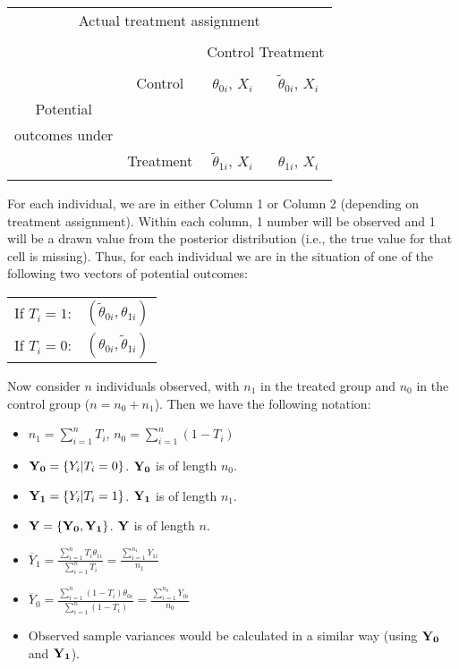 \documentclass[oneside,letterpaper,titlepage,12pt]{article}
\begin{document}
\begin{center}
\begin{tabular}{cc|c|c|}
\multicolumn{4}{c}{\hspace*{4cm} Actual treatment assignment} \\
\\
\multicolumn{2}{c}{} & \multicolumn{2}{c}{Control \hfill Treatment} \\
\cline{3-4}
& & & \phantom{abcd} \\
& Control & $\theta_{0i}$, $X_i$ & $\tilde{\theta}_{0i}$, $X_i$ \\
Potential & & &  \phantom{abcd} \\
\cline{3-4}
outcomes under & & & \phantom{abcd} \\
& Treatment  & $\tilde{\theta}_{1i}$, $X_i$ & $\theta_{1i}$, $X_i$ \\
& & & \phantom{abcd} \\
\cline{3-4}
\end{tabular}
\end{center}
 
For each individual, we are in either Column 1 or Column 2 (depending on treatment assignment).  Within each column, 1 number will be observed and 1 will be a drawn
value from the posterior distribution (i.e., the true value for that cell is missing). Thus, for each individual we are in the situation of one of the 
following two vectors of potential outcomes:

\begin{center}
\begin{tabular}{rl}
If $T_i=1$: & $(\tilde\theta_{0i}, \theta_{1i})$ \\
If $T_i=0$: & $(\theta_{0i}, \tilde\theta_{1i})$ \\
\end{tabular}
\end{center}

Now consider $n$ individuals observed, with $n_1$ in the treated group and $n_0$ in the control group ($n=n_0+n_1$).  Then we have the following notation:
\begin{itemize}
\item $n_1=\sum_{i=1}^n T_i$, $n_0=\sum_{i=1}^n (1-T_i)$
\item ${\bf Y_0} = \{Y_{i}|T_i=0\}$.  ${\bf Y_0}$ is of length $n_0$.
\item ${\bf Y_1} = \{Y_{i}|T_i=1\}$.  ${\bf Y_1}$ is of length $n_1$.
\item ${\bf Y} = \{ {\bf Y_0}, {\bf Y_1}\}$.  ${\bf Y}$ is of length $n$.
\item $\overline{Y}_1 = \frac{\sum_{i=1}^n T_i \theta_{1i}}{\sum_{i=1}^n T_i}=\frac{\sum_{i=1}^{n_1} Y_{1i}}{n_1}$
\item $\overline{Y}_0 = \frac{\sum_{i=1}^n (1-T_i) \theta_{0i}}{\sum_{i=1}^n (1-T_i)}=\frac{\sum_{i=1}^{n_0} Y_{0i}}{n_0}$
\item Observed sample variances would be calculated in a similar way (using ${\bf Y_0}$ and ${\bf Y_1}$).
\end{itemize}
\end{document}
